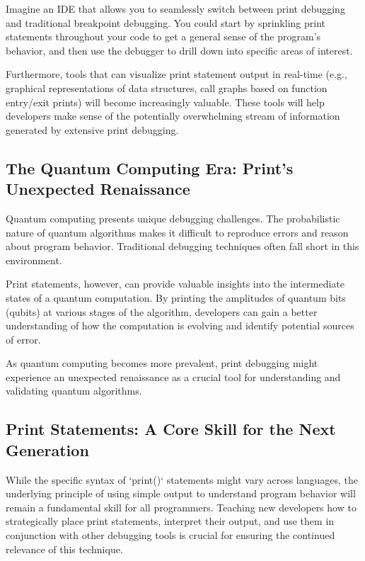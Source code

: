 \documentclass{article}
\begin{document}
{{{{Imagine an IDE that allows you to seamlessly switch between print debugging and traditional breakpoint debugging.  You could start by sprinkling print statements throughout your code to get a general sense of the program's behavior, and then use the debugger to drill down into specific areas of interest.

Furthermore, tools that can visualize print statement output in real-time (e.g., graphical representations of data structures, call graphs based on function entry/exit prints) will become increasingly valuable. These tools will help developers make sense of the potentially overwhelming stream of information generated by extensive print debugging.

\subsection*{The Quantum Computing Era: Print's Unexpected Renaissance}

Quantum computing presents unique debugging challenges.  The probabilistic nature of quantum algorithms makes it difficult to reproduce errors and reason about program behavior. Traditional debugging techniques often fall short in this environment.

Print statements, however, can provide valuable insights into the intermediate states of a quantum computation. By printing the amplitudes of quantum bits (qubits) at various stages of the algorithm, developers can gain a better understanding of how the computation is evolving and identify potential sources of error.

As quantum computing becomes more prevalent, print debugging might experience an unexpected renaissance as a crucial tool for understanding and validating quantum algorithms.

\subsection*{Print Statements: A Core Skill for the Next Generation}

While the specific syntax of `print()` statements might vary across languages, the underlying principle of using simple output to understand program behavior will remain a fundamental skill for all programmers.  Teaching new developers how to strategically place print statements, interpret their output, and use them in conjunction with other debugging tools is crucial for ensuring the continued relevance of this technique.

}}}}
\end{document}
